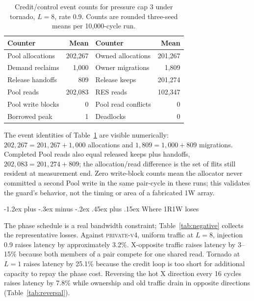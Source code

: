 \documentclass[10pt,twocolumn]{article}
\makeatletter
\newcommand{\privatefour}{\textsc{private-v4}\xspace}
\renewcommand\subsection{\@startsection{subsection}{2}{\z@}%
  {-1.2ex plus -.3ex minus -.2ex}%
  {.45ex plus .15ex}%
  {\normalfont\normalsize\bfseries}}
\makeatother
\begin{document}
\begin{table}[t]
\centering
\caption{Credit/control event counts for pressure cap 3 under tornado,
$L=8$, rate 0.9. Counts are rounded three-seed means per 10,000-cycle run.}
\label{tab:events}
\scriptsize
\begin{tabular}{lr@{\qquad}lr}
\toprule
Counter & Mean & Counter & Mean\\
\midrule
Pool allocations & 202,267 & Owned allocations & 201,267\\
Demand reclaims & 1,000 & Owner migrations & 1,809\\
Release handoffs & 809 & Release keeps & 201,274\\
Pool reads & 202,083 & RES reads & 102,347\\
Pool write blocks & 0 & Pool read conflicts & 0\\
Borrowed peak & 1 & Deadlocks & 0\\
\bottomrule
\end{tabular}
\end{table}

The event identities of Table~\ref{tab:events} are visible numerically:
\(202{,}267=201{,}267+1{,}000\) allocations and
\(1{,}809=1{,}000+809\) migrations. Completed Pool reads also equal released
keeps plus handoffs, \(202{,}083=201{,}274+809\); the allocation/read
difference is the set of flits still resident at measurement end. Zero
write-block counts mean the allocator never committed a second Pool write in
the same pair-cycle in these runs; this validates the guard's behavior, not
the timing or area of a fabricated 1W array.

\subsection{Where 1R1W loses}

The phase schedule is a real bandwidth constraint; Table~\ref{tab:negative}
collects the representative losses. Against \privatefour,
uniform traffic at $L=8$, injection 0.9 raises latency by approximately 3.2\%.
X-opposite traffic raises latency by 3--15\% because both members of a pair
compete for one shared read. Tornado at $L=1$ raises latency by 25.1\% because
the credit loop is too short for additional capacity to repay the phase cost.
Reversing the hot X direction every 16 cycles raises latency by 7.8\% while
ownership and old traffic drain in opposite directions
(Table~\ref{tab:reversal}).
\end{document}
